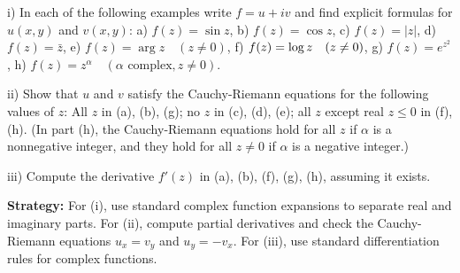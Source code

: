 \begin{problembox}
\begin{problemstatement}
i) In each of the following examples write \( f = u + iv \) and find explicit formulas for \( u(x, y) \) and \( v(x, y) \):
a) \( f(z) = \sin z \), b) \( f(z) = \cos z \),
c) \( f(z) = |z| \), d) \( f(z) = \bar{z} \),
e) \( f(z) = \arg z \quad (z \neq 0) \), f) \( f(z) = \log z \quad (z \neq 0) \),
g) \( f(z) = e^{z^2} \), h) \( f(z) = z^\alpha \quad (\alpha \text{ complex}, z \neq 0) \).

ii) Show that \( u \) and \( v \) satisfy the Cauchy-Riemann equations for the following values of \( z \): All \( z \) in (a), (b), (g); no \( z \) in (c), (d), (e); all \( z \) except real \( z \leq 0 \) in (f), (h). (In part (h), the Cauchy-Riemann equations hold for all \( z \) if \( \alpha \) is a nonnegative integer, and they hold for all \( z \neq 0 \) if \( \alpha \) is a negative integer.)

iii) Compute the derivative \( f'(z) \) in (a), (b), (f), (g), (h), assuming it exists.
\end{problemstatement}
\end{problembox}

\noindent\textbf{Strategy:} For (i), use standard complex function expansions to separate real and imaginary parts. For (ii), compute partial derivatives and check the Cauchy-Riemann equations \( u_x = v_y \) and \( u_y = -v_x \). For (iii), use standard differentiation rules for complex functions.

